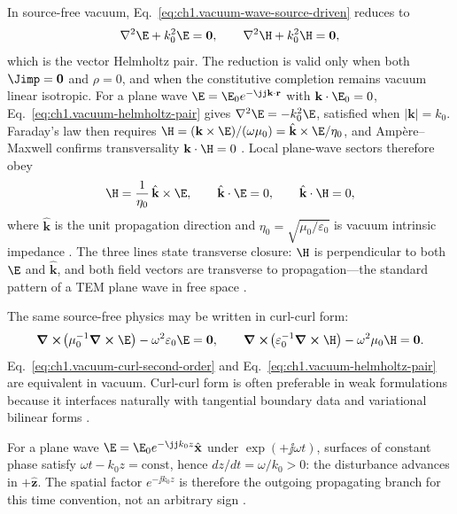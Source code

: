 In source-free vacuum, Eq.~\eqref{eq:ch1.vacuum-wave-source-driven} reduces to
\begin{equation}
\label{eq:ch1.vacuum-helmholtz-pair}
\nabla^2\E+k_0^2\E=\mathbf{0},\qquad
\nabla^2\H+k_0^2\H=\mathbf{0},
\end{equation}
which is the vector Helmholtz pair. The reduction is valid only when both
\(\Jimp=\mathbf{0}\) and \(\rho=0\), and when the constitutive completion remains
vacuum linear isotropic. For a plane wave $\E=\E_0 e^{-\jj\mathbf{k}\cdot\mathbf{r}}$ with $\mathbf{k}\cdot\E_0=0$, Eq.~\eqref{eq:ch1.vacuum-helmholtz-pair} gives $\nabla^2\E=-k_0^2\E$, satisfied when $|\mathbf{k}|=k_0$. Faraday's law then requires $\H=(\mathbf{k}\times\E)/(\omega\mu_0)=\hat{\mathbf{k}}\times\E/\eta_0$, and Amp\`ere--Maxwell confirms transversality $\mathbf{k}\cdot\H=0$ \cite{stratton1941,jackson1999}. Local plane-wave sectors therefore obey
\begin{equation}
\label{eq:ch1.local-plane-wave-relations}
\H=\frac{1}{\eta_0}\,\hat{\mathbf{k}}\times\E,\qquad
\hat{\mathbf{k}}\cdot\E=0,\qquad
\hat{\mathbf{k}}\cdot\H=0,
\end{equation}
where \(\hat{\mathbf{k}}\) is the unit propagation direction and \(\eta_0=\sqrt{\mu_0/\varepsilon_0}\) is vacuum intrinsic impedance \cite{stratton1941}. The three lines state transverse closure: $\H$ is perpendicular to both $\E$ and $\hat{\mathbf{k}}$, and both field vectors are transverse to propagation---the standard pattern of a TEM plane wave in free space \cite{jackson1999}.

The same source-free physics may be written in curl-curl form:
\begin{equation}
\label{eq:ch1.vacuum-curl-second-order}
\curl\!\left(\mu_0^{-1}\curl \E\right)-\omega^2\varepsilon_0\E=\mathbf{0},\qquad
\curl\!\left(\varepsilon_0^{-1}\curl \H\right)-\omega^2\mu_0\H=\mathbf{0}.
\end{equation}
Eq.~\eqref{eq:ch1.vacuum-curl-second-order} and
Eq.~\eqref{eq:ch1.vacuum-helmholtz-pair} are equivalent in vacuum. Curl-curl form
is often preferable in weak formulations because it interfaces naturally with
tangential boundary data and variational bilinear forms
\cite{stratton1941}.

For a plane wave $\E=\E_0 e^{-\jj k_0 z}\hat{\mathbf{x}}$ under $\exp(+\jj\omega t)$,
surfaces of constant phase satisfy $\omega t-k_0 z=\mathrm{const}$, hence
$dz/dt=\omega/k_0>0$: the disturbance advances in $+\hat{\mathbf{z}}$. The spatial
factor $e^{-\jj k_0 z}$ is therefore the outgoing propagating branch for this
time convention, not an arbitrary sign \cite{stratton1941,jackson1999}.

